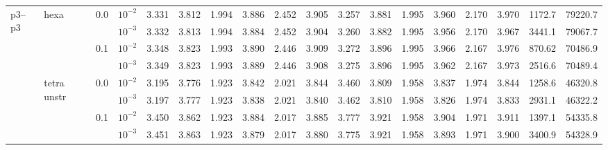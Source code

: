 \begin{longtable}{llclrrrrrrrrrrrrrr}
\multirow{8}{*}{p3--p3} & \multirow{4}{*}{hexa} & \multirow{2}{*}{0.0} & $10^{-2}$ & 3.331 & 3.812 & 1.994 & 3.886 & 2.452 & 3.905 & 3.257 & 3.881 & 1.995 & 3.960 & 2.170 & 3.970 & 1172.7 & 79220.7 \\
& & & $10^{-3}$ & 3.332 & 3.813 & 1.994 & 3.884 & 2.452 & 3.904 & 3.260 & 3.882 & 1.995 & 3.956 & 2.170 & 3.967 & 3441.1 & 79067.7 \\\cline{3-18}
& & \multirow{2}{*}{0.1} & $10^{-2}$ & 3.348 & 3.823 & 1.993 & 3.890 & 2.446 & 3.909 & 3.272 & 3.896 & 1.995 & 3.966 & 2.167 & 3.976 & 870.62 & 70486.9 \\
& & & $10^{-3}$ & 3.349 & 3.823 & 1.993 & 3.889 & 2.446 & 3.908 & 3.275 & 3.896 & 1.995 & 3.962 & 2.167 & 3.973 & 2516.6 & 70489.4 \\\cline{2-18}
& \multirow{4}{*}{tetra unstr} & \multirow{2}{*}{0.0} & $10^{-2}$ & 3.195 & 3.776 & 1.923 & 3.842 & 2.021 & 3.844 & 3.460 & 3.809 & 1.958 & 3.837 & 1.974 & 3.844 & 1258.6 & 46320.8 \\
& & & $10^{-3}$ & 3.197 & 3.777 & 1.923 & 3.838 & 2.021 & 3.840 & 3.462 & 3.810 & 1.958 & 3.826 & 1.974 & 3.833 & 2931.1 & 46322.2 \\\cline{3-18}
& & \multirow{2}{*}{0.1} & $10^{-2}$ & 3.450 & 3.862 & 1.923 & 3.884 & 2.017 & 3.885 & 3.777 & 3.921 & 1.958 & 3.904 & 1.971 & 3.911 & 1397.1 & 54335.8 \\
& & & $10^{-3}$ & 3.451 & 3.863 & 1.923 & 3.879 & 2.017 & 3.880 & 3.775 & 3.921 & 1.958 & 3.893 & 1.971 & 3.900 & 3400.9 & 54328.9 \\\hline

\bottomrule
\end{longtable}
\normalsize
